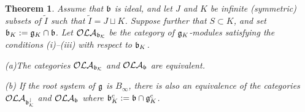 \documentclass[12pt]{amsart}
\def\mathfrak{\frak}
\def\mathcal{\cal}
\theoremstyle{plain} %
\numberwithin{equation}{section}
\theoremstyle{definition}
\theoremstyle{remark}
\theoremstyle{plain} %
\newtheorem{theorem}[definition]{Theorem}
\newcommand{\fg}{\mathfrak{g}}
\newcommand{\fb}{\mathfrak{b}}
\begin{document}
\begin{theorem}\label{qr} Assume that   $\mathfrak b$ is ideal, and let $J$ and $K$ be infinite (symmetric) subsets of $\tilde I$ such that
  $\tilde I=J\sqcup K$.  Suppose further that $S\subset K$, and set   $\mathfrak b_K:=\mathfrak g_K\cap \mathfrak b$. Let $\mathcal{OLA}_{\mathfrak b_K}$ be the 
category of $\mathfrak g_K$-modules satisfying the conditions (i)--(iii) with respect to $\mathfrak{b}_K$. 

 (a)The categories $\mathcal{OLA}_{\mathfrak b_K}$ and $\mathcal{OLA}_{\mathfrak b}$ are equivalent.

(b) If the root system of $\fg$ is $B_{\infty}$, there is also an equivalence of the categories $\mathcal{OLA}_{\mathfrak b_K^c}$ and $\mathcal{OLA}_{\mathfrak b}$
where $\fb^c_K:=\fb\cap\fg^c_K$.
\end{theorem}
\end{document}
